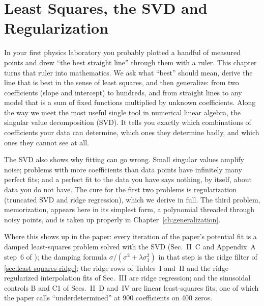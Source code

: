 \chapter{Least Squares, the SVD and Regularization}\label{ch:least-squares}

\begin{chapterintro}
In your first physics laboratory you probably plotted a handful of measured points and drew ``the best straight line'' through them with a ruler. This chapter turns that ruler into mathematics. We ask what ``best'' should mean, derive the line that is best in the sense of least squares, and then generalize: from two coefficients (slope and intercept) to hundreds, and from straight lines to any model that is a sum of fixed functions multiplied by unknown coefficients. Along the way we meet the most useful single tool in numerical linear algebra, the singular value decomposition (SVD). It tells you exactly which combinations of coefficients your data can determine, which ones they determine badly, and which ones they cannot see at all.

The SVD also shows why fitting can go wrong. Small singular values amplify noise; problems with more coefficients than data points have infinitely many perfect fits; and a perfect fit to the data you have says nothing, by itself, about data you do not have. The cure for the first two problems is regularization (truncated SVD and ridge regression), which we derive in full. The third problem, memorization, appears here in its simplest form, a polynomial threaded through noisy points, and is taken up properly in Chapter~\ref{ch:generalization}.

Where this shows up in the paper: every iteration of the paper's potential fit is a damped least-squares problem solved with the SVD (Sec.~II~C and Appendix~A step~6 of \cite{soniR1}); the damping formula $\sigma/(\sigma^2+\lambda\sigma_1^2)$ in that step is the ridge filter of \cref{sec:least-squares-ridge}; the ridge rows of Tables~I and~II and the ridge-regularized interpolation fits of Sec.~III are ridge regression; and the sinusoidal controls B and C1 of Secs.~II~D and~IV are linear least-squares fits, one of which the paper calls ``underdetermined'' at 900 coefficients on 400 zeros.
\end{chapterintro}

